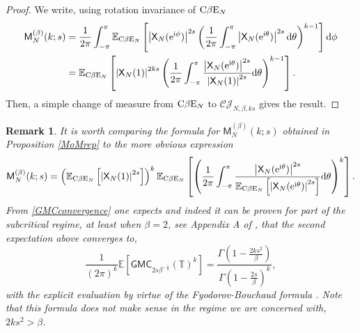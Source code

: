 \documentclass[]{article}
\newtheorem{rmk}[thm]{Remark}
\begin{document}
\begin{proof}
We write, using rotation invariance of $\textnormal{C}\beta \textnormal{E}_N$
\begin{align*}
\mathsf{M}^{(\beta)}_N(k;s)&=\frac{1}{2\pi}\int_{-\pi}^\pi \mathbb{E}_{\textnormal{C}\beta \textnormal{E}_N}\left[\left|\mathsf{X}_N(\mathrm{e^{\mathrm{i}\phi}})\right|^{2s}\left(\frac{1}{2\pi}\int_{-\pi}^\pi \left|\mathsf{X}_N(\mathrm{e}^{\mathrm{i}\theta})\right|^{2s}\mathrm{d}\theta\right)^{k-1}\right]\mathrm{d}\phi\\
&=\mathbb{E}_{\textnormal{C}\beta \textnormal{E}_N}\left[\left|\mathsf{X}_N(1)\right|^{2ks}\left(\frac{1}{2\pi}\int_{-\pi}^\pi \frac{\left|\mathsf{X}_N(\mathrm{e}^{\mathrm{i}\theta})\right|^{2s}}{\left|\mathsf{X}_N(1)\right|^{2s}}\mathrm{d}\theta\right)^{k-1}\right].
\end{align*}
Then, a simple change of measure from $\textnormal{C}\beta \textnormal{E}_N$ to $\mathcal{CJ}_{N,\beta,ks}$ gives the result.
\end{proof}

\begin{rmk}\label{FormulaComparison}
It is worth comparing the formula for $\mathsf{M}_N^{(\beta)}(k;s)$ obtained in Proposition \ref{MoMrep} to the more obvious expression
\begin{equation*}
\mathsf{M}_N^{(\beta)}(k;s)= \left(\mathbb{E}_{\textnormal{C}\beta \textnormal{E}_N}\left[\left|\mathsf{X}_N(1)\right|^{2s}\right]  \right)^k \mathbb{E}_{\textnormal{C}\beta \textnormal{E}_N}\left[\left(\frac{1}{2\pi}\int_{-\pi}^\pi \frac{\left|\mathsf{X}_N(\mathrm{e}^{\mathrm{i}\theta})\right|^{2s}}{\mathbb{E}_{\textnormal{C}\beta \textnormal{E}_N}\left[\left|\mathsf{X}_N(\mathrm{e}^{\mathrm{i}\theta})\right|^{2s}\right] }\mathrm{d}\theta\right)^k\right].
\end{equation*}
From \eqref{GMCconvergence} one expects and indeed it can be proven for part of the subcritical regime, at least when $\beta=2$, see Appendix A of \cite{KeatingWong}, that the second expectation above converges to,
\begin{equation*}
\frac{1}{(2\pi)^k}\mathbb{E}\left[\mathsf{GMC}_{2s\beta^{-\frac{1}{2}}}(\mathbb{T})^k\right]=\frac{\Gamma\left(1-\frac{2ks^2}{\beta}\right)}{\Gamma \left(1-\frac{2s}{\beta}\right)^k},
\end{equation*}
with the explicit evaluation by virtue of the Fyodorov-Bouchaud formula \cite{FyodorovBouchaud,Remy,ChhaibiNajnudel}. Note that this formula does not make sense in the regime we are concerned with, $2ks^2>\beta$.
\end{rmk}
\end{document}
